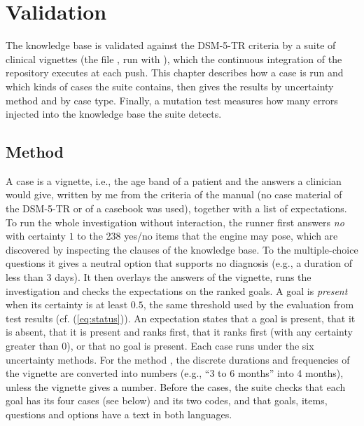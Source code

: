 \chapter{Validation}
\label{chap:validation}

The knowledge base is validated against the DSM-5-TR criteria by a suite of
clinical vignettes (the file , run with
), which the continuous integration of the
repository executes at each push. This chapter describes how a case is run and
which kinds of cases the suite contains, then gives the results by uncertainty
method and by case type. Finally, a mutation test measures how many errors
injected into the knowledge base the suite detects.

\section{Method}

A case is a vignette, i.e., the age band of a patient and the answers a
clinician would give, written by me from the criteria of the manual (no case
material of the DSM-5-TR or of a casebook was used), together with a list of
expectations. To run the whole investigation without interaction, the runner first answers
\emph{no} with certainty $1$ to the 238 yes/no items that the engine may pose,
which are discovered by inspecting the clauses of the knowledge base. To the
multiple-choice questions it gives a neutral option that supports no diagnosis
(e.g., a duration of less than 3 days). It then overlays the answers of the
vignette, runs the investigation and checks the expectations on the ranked
goals. A goal is \emph{present} when its certainty is at least $0.5$, the same
threshold used by the evaluation from test results (cf. (\ref{eq:status})). An
expectation states that a goal is present, that it is absent, that it is
present and ranks first, that it ranks first (with any certainty greater than
$0$), or that no goal is present. Each case runs under the six uncertainty methods. For the method
, the discrete durations and frequencies of the vignette
are converted into numbers (e.g., ``3 to 6 months'' into 4 months), unless the
vignette gives a number. Before the cases, the suite checks that each goal has
its four cases (see below) and its two codes, and that goals, items, questions
and options have a text in both languages.

